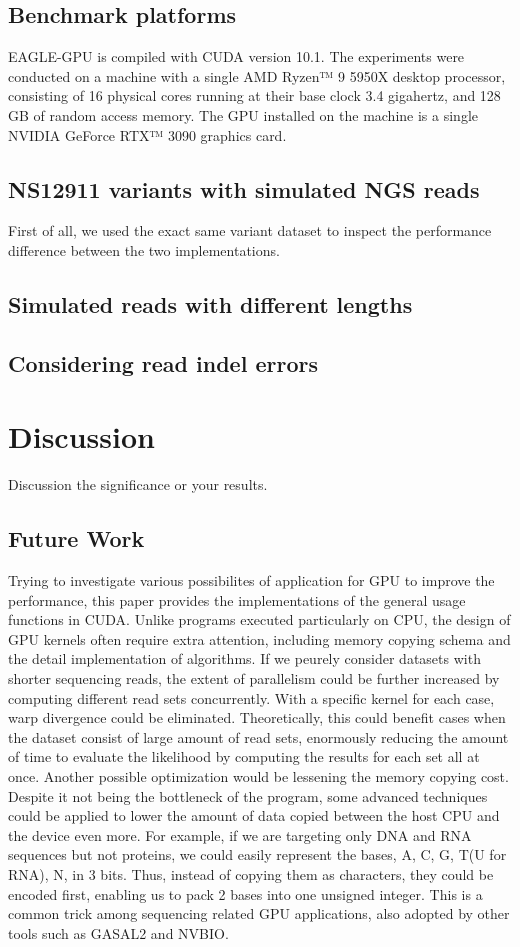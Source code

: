 \documentclass{PHlab-thesis}
\begin{document}
\section{Benchmark platforms}
EAGLE-GPU is compiled with CUDA version 10.1. The experiments were conducted on a machine with a single AMD Ryzen™ 9 5950X desktop processor, consisting of 16 physical cores running at their base clock 3.4 gigahertz, and 128 GB of random access memory. The GPU installed on the machine is a single NVIDIA GeForce RTX™ 3090 graphics card.

\section{NS12911 variants with simulated NGS reads}
First of all, we used the exact same variant dataset to inspect the performance difference between the two implementations.

\section{Simulated reads with different lengths}

\section{Considering read indel errors}

\chapter{Discussion}
Discussion the significance or your results.
\section{Future Work}
Trying to investigate various possibilites of application for GPU to improve the performance, this paper provides the implementations of the general usage functions in CUDA. Unlike programs executed particularly on CPU, the design of GPU kernels often require extra attention, including memory copying schema and the detail implementation of algorithms. If we peurely consider datasets with shorter sequencing reads, the extent of parallelism could be further increased by computing different read sets concurrently. With a specific kernel for each case, warp divergence could be eliminated. Theoretically, this could benefit cases when the dataset consist of large amount of read sets, enormously reducing the amount of time to evaluate the likelihood by computing the results for each set all at once. Another possible optimization would be lessening the memory copying cost. Despite it not being the bottleneck of the program, some advanced techniques could be applied to lower the amount of data copied between the host CPU and the device even more. For example, if we are targeting only DNA and RNA sequences but not proteins, we could easily represent the bases, A, C, G, T(U for RNA), N, in 3 bits. Thus, instead of copying them as characters, they could be encoded first, enabling us to pack 2 bases into one unsigned integer. This is a common trick among sequencing related GPU applications, also adopted by other tools such as GASAL2 and NVBIO.
\end{document}
